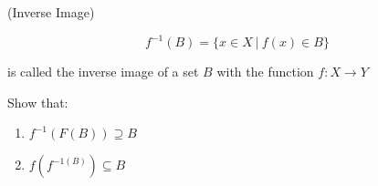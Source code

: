 (Inverse Image)

$$f^{-1}(B) = \{x \in X ~|~ f(x) \in B\}$$

is called the inverse image of a set $B$ with the function $f: X \rightarrow Y$

Show that:

\begin{enumerate}
	\item $f^{-1}(F(B)) \supseteq B$
	\item $f(f^{-1(B)}) \subseteq B$
\end{enumerate}


\begin{solution}$ $
	
\end{solution}